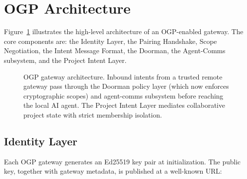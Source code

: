 \documentclass[conference]{IEEEtran}
\begin{document}
\section{OGP Architecture}
\label{sec:architecture}

Figure~\ref{fig:arch} illustrates the high-level architecture of an OGP-enabled gateway. The core components are: the Identity Layer, the Pairing Handshake, Scope Negotiation, the Intent Message Format, the Doorman, the Agent-Comms subsystem, and the Project Intent Layer.

\begin{figure}[htbp]
\centering
{}
\caption{OGP gateway architecture. Inbound intents from a trusted remote gateway pass through the Doorman policy layer (which now enforces cryptographic scopes) and agent-comms subsystem before reaching the local AI agent. The Project Intent Layer mediates collaborative project state with strict membership isolation.}
\label{fig:arch}
\end{figure}

\subsection{Identity Layer}

Each OGP gateway generates an Ed25519 key pair at initialization. The public key, together with gateway metadata, is published at a well-known URL:
\end{document}
